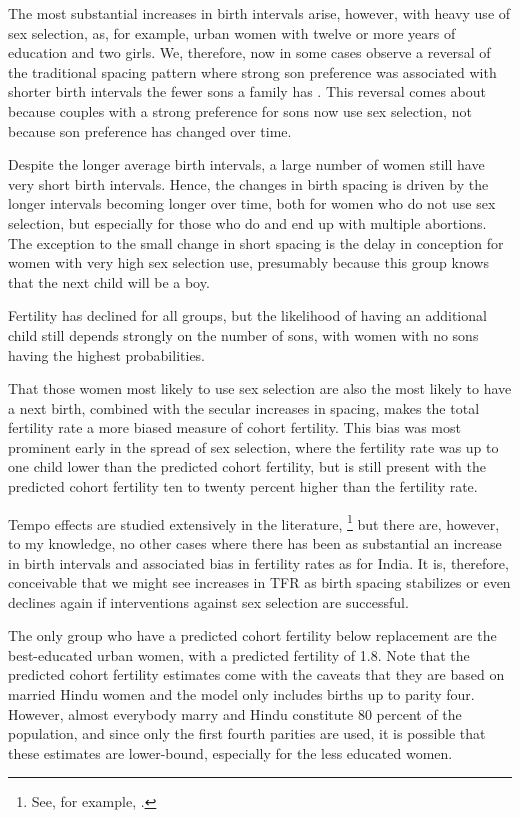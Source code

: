 \documentclass[12pt,letterpaper]{article}
\begin{document}
The most substantial increases in birth intervals arise, however, with heavy use of sex 
selection, as, for example, urban women with twelve or more years of education and two 
girls.
We, therefore, now in some cases observe a reversal of the traditional spacing
pattern where strong son preference was associated with shorter birth intervals the fewer 
sons a family has \citep{ben-porath76b,Leung1988}.
This reversal comes about because couples with a strong preference for sons now use sex 
selection, not because son preference has changed over time.

Despite the longer average birth intervals, a large number of women still have very
short birth intervals.
Hence, the changes in birth spacing is driven by the longer intervals becoming longer
over time, both for women who do not use sex selection, but especially for those who
do and end up with multiple abortions.
The exception to the small change in short spacing is the delay in conception for
women with very high sex selection use, presumably because this group knows that the
next child will be a boy.


Fertility has declined for all groups, but the likelihood of having an additional child
still depends strongly on the number of sons, with women with no sons having the highest 
probabilities.

That those women most likely to use sex selection are also the most likely to have a
next birth, combined with the secular increases in spacing, makes the total fertility 
rate a more biased measure of cohort fertility.
This bias was most prominent early in the spread of sex selection, where the fertility
rate was up to one child lower than the predicted cohort fertility, but is still
present with the predicted cohort fertility ten to twenty percent higher than 
the fertility rate.

Tempo effects are studied extensively in the literature,%
\footnote{
See, for example, \citet{Bongaarts1999}.
}
but there are, however, to my knowledge, no other cases where there has been as 
substantial an increase in birth intervals and associated bias in fertility rates 
as for India.
It is, therefore, conceivable that we might see increases in TFR as birth spacing 
stabilizes or even declines again if interventions against sex selection are successful.

The only group who have a predicted cohort fertility below replacement are the 
best-educated urban women, with a predicted fertility of 1.8. 
Note that the predicted cohort fertility estimates come with the caveats that they are
based on married Hindu women and the model only includes births up to parity four.
However, almost everybody marry and Hindu constitute 80 percent of the population,
and since only the first fourth parities are used, it is possible that these 
estimates are lower-bound, especially for the less educated women.
\end{document}
